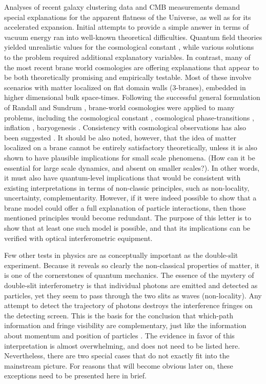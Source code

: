 \documentclass[a4paper,aps,prl,twocolumn,showpacs]{revtex4}
\begin{document}
Analyses of recent galaxy clustering data and CMB measurements
demand special explanations for the apparent flatness of the
Universe, as well as for its accelerated expansion. Initial
attempts to provide a simple answer in terms of vacuum energy ran
into well-known theoretical difficulties. Quantum field theories
yielded unrealistic values for the cosmological constant
\cite{wein,sahn}, while various solutions to the problem required
additional explanatory variables. In contrast, many of the most
recent brane world cosmologies are offering explanations that
appear to be both theoretically promising and empirically
testable. Most of these involve scenarios with matter localized on
flat domain walls (3-branes), embedded in higher dimensional bulk
space-times. Following the successful general formulation of
Randall and Sundrum \cite{rand,sund}, brane-world cosmologies were
applied to many problems, including the cosmological constant
\cite{stye}, cosmological phase-transitions \cite{perk}, inflation
\cite{dval,khou}, baryogenesis \cite{gaba}. Consistency with
cosmological observations has also been suggested
\cite{deff,alca}. It should be also noted, however, that the idea
of matter localized on a brane cannot be entirely satisfactory
theoretically, unless it is also shown to have plausible
implications for small scale phenomena. (How can it be essential
for large scale dynamics, and absent on smaller scales?). In other
words, it must also have quantum-level implications that would be
consistent with existing interpretations in terms of non-classic
principles, such as non-locality, uncertainty, complementarity.
However, if it were indeed possible to show that a brane model
could offer a full explanation of particle interactions, then
those mentioned principles would become redundant. The purpose of
this letter is to show that at least one such model is possible,
and that its implications can be verified with optical
interferometric equipment.

Few other tests in physics are as conceptually important as the
double-slit experiment. Because it reveals so clearly the
non-classical properties of matter, it is one of the cornerstones
of quantum mechanics. The essence of the mystery of double-slit
interferometry is that individual photons are emitted and detected
as particles, yet they seem to pass through the two slits as waves
(non-locality). Any attempt to detect the trajectory of photons
destroys the interference fringes on the detecting screen. This is
the basis for the conclusion that which-path information and
fringe visibility are complementary, just like the information
about momentum and position of particles \cite{pdds,trif}. The
evidence in favor of this interpretation is almost overwhelming,
and does not need to be listed here. Nevertheless, there are two
special cases that do not exactly fit into the mainstream picture.
For reasons that will become obvious later on, these exceptions
need to be presented here in brief.
\end{document}
